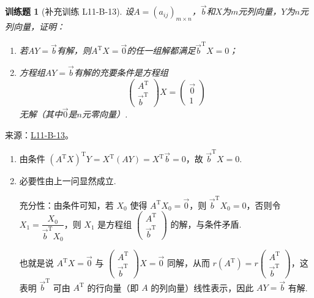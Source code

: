 \documentclass[UTF8,12pt,a4paper,fontset=fandol]{ctexart}
\newtheorem{exercise}{训练题}[section]
\begin{document}
\begin{exercise}[补充训练 L11-B-13]\label{prob:L11-B-13}
设$A=(a_{ij})_{m\times n}$，$\vec{b}$和$X$为$m$元列向量，$Y$为$n$元列向量，证明：
        \begin{enumerate}
            \item 若$AY=\vec{b}$有解，则$A^\mathrm{T}X=\vec{0}$的任一组解都满足$\vec{b}^\mathrm{T}X=0$；

            \item 方程组$AY=\vec{b}$有解的充要条件是方程组
\[\begin{pmatrix}
                          A^\mathrm{T} \\ \vec{b}^\mathrm{T}
                      \end{pmatrix}X=\begin{pmatrix}
                          \vec{0} \\ 1
                      \end{pmatrix}\]
无解（其中$\vec{0}$是$n$元零向量）.
        \end{enumerate}
\end{exercise}
\noindent 来源：\href{https://github.com/yhwu-is/Linear-Algebra-Left-Undone/blob/new/%E8%AE%B2%E4%B9%89/%E4%B8%93%E9%A2%98/11%20%E6%9C%9D%E8%8A%B1%E5%A4%95%E6%8B%BE.tex}{L11-B-13}。
\begin{solve}
\begin{enumerate}
                \item 由条件 $(A^\mathrm{T}X)^\mathrm{T}Y=X^\mathrm{T}(AY)=X^\mathrm{T}\vec{b}=0$，故 $\vec{b}^\mathrm{T}X=0$.
                \item 必要性由上一问显然成立.

                充分性：由条件可知，若 $X_0$ 使得 $A^\mathrm{T}X_0=\vec{0}$，则 $\vec{b}^\mathrm{T}X_0=0$，否则令 $X_1 =\dfrac{X_0}{\vec{b}^\mathrm{T}X_0}$，则 $X_1$ 是方程组 $\begin{pmatrix} A^\mathrm{T} \\ \vec{b}^\mathrm{T} \end{pmatrix}$ 的解，与条件矛盾.

                也就是说 $A^\mathrm{T}X=\vec{0}$ 与 $\begin{pmatrix} A^\mathrm{T} \\ \vec{b}^\mathrm{T} \end{pmatrix} X = \vec{0}$ 同解，从而 $r(A^\mathrm{T}) = r\begin{pmatrix} A^\mathrm{T} \\ \vec{b}^\mathrm{T} \end{pmatrix}$，这表明 $\vec{b}^\mathrm{T}$ 可由 $A^\mathrm{T}$ 的行向量（即 $A$ 的列向量）线性表示，因此 $AY=\vec{b}$ 有解.
            \end{enumerate}
\end{solve}
\end{document}
